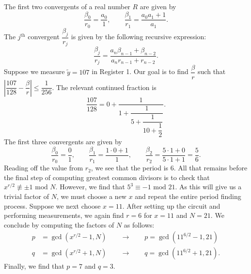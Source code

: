 \documentclass{article}
\begin{document}
The first two convergents of a real number $R$ are given by 
\begin{equation*}
\dfrac{\beta_0}{r_0} = \dfrac{a_0}{1}, \qquad \dfrac{\beta_1}{r_1} = \dfrac{a_0a_1+1}{a_1}.
\end{equation*}
The $j^\text{th}$ convergent $\dfrac{\beta_j}{r_j}$ is given by the following recursive expression:
\begin{equation*}
\dfrac{\beta_j}{r_j} = \dfrac{a_n\beta_{n-1} + \beta_{n-2}}{a_nr_{n-1}+r_{n-2}}.
\end{equation*}
Suppose we measure $\widetilde{y} = 107$ in Register 1. Our goal is to find $\dfrac{\beta}{r}$ such that $\left|\dfrac{107}{128}-\dfrac{\beta}{r}\right| \leq \dfrac{1}{256}$. The relevant continued fraction is
\begin{equation*}
\dfrac{107}{128} = 0 + \dfrac{1}{1+\dfrac{1}{5+\dfrac{1}{10+\dfrac{1}{2}}}}.
\end{equation*}
The first three convergents are given by
\begin{equation*}
\dfrac{\beta_0}{r_0} = \dfrac{0}{1}, \qquad \dfrac{\beta_1}{r_1} = \dfrac{1\cdot 0 + 1}{1}, \qquad \dfrac{\beta_2}{r_2} = \dfrac{5\cdot 1 + 0}{5\cdot 1 + 1} = \dfrac{5}{6}.
\end{equation*}
Reading off the value from $r_2$, we see that the period is $6$. All that remains before the final step of computing greatest common divisors is to check that $x^{r/2} \not \equiv \pm 1 \text{ mod }N$. However, we find that $5^3 \equiv -1 \text{ mod } 21$. As this will give us a trivial factor of $N$, we must choose a new $x$ and repeat the entire period finding process. Suppose we next choose $x=11$. After setting up the circuit and performing measurements, we again find $r=6$ for $x=11$ and $N=21$. We conclude by computing the factors of $N$ as follows:
\begin{align*}
p &= \gcd(x^{r/2} - 1, N) \qquad \to \qquad  p = \gcd(11^{6/2}-1, 21) \\
q &= \gcd(x^{r/2} + 1, N) \qquad \to \qquad q = \gcd(11^{6/2}+1, 21).
\end{align*}
Finally, we find that $p = 7$ and $q=3$.
\end{document}
